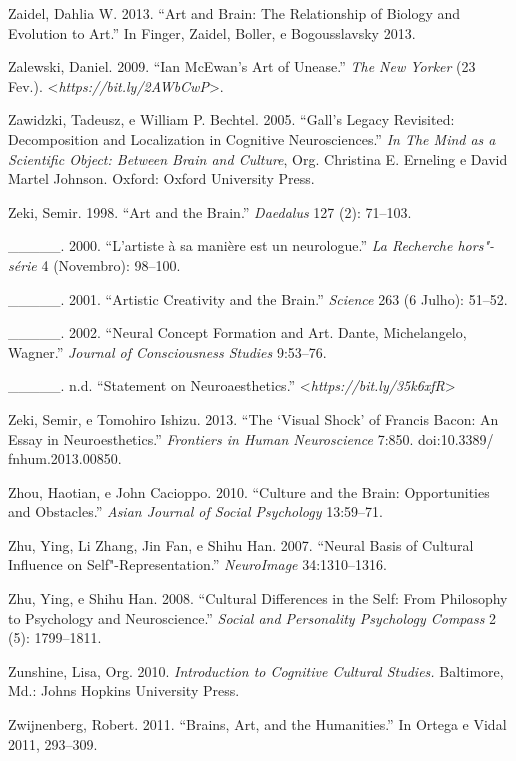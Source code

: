 {\begin{Parskip}
Zaidel, Dahlia W. 2013. ``Art and Brain: The Relationship of Biology and
Evolution to Art.'' In Finger, Zaidel, Boller, e Bogousslavsky 2013.

Zalewski, Daniel. 2009. ``Ian McEwan's Art of Unease.'' \emph{The New
Yorker} (23 Fev.).
\textless{}\emph{https://bit.ly/2AWbCwP}\textgreater{}.

Zawidzki, Tadeusz, e William P. Bechtel. 2005. ``Gall's Legacy
Revisited: Decomposition and Localization in Cognitive Neurosciences.''
\emph{In The Mind as a Scientific Object: Between Brain and Culture},
Org. Christina E. Erneling e David Martel Johnson. Oxford: Oxford
University Press.

Zeki, Semir. 1998. ``Art and the Brain.'' \emph{Daedalus} 127 (2):
71--103.

\_\_\_\_\_. 2000. ``L'artiste à sa manière est un neurologue.'' \emph{La
Recherche hors"-série} 4 (Novembro): 98--100.

\_\_\_\_\_. 2001. ``Artistic Creativity and the Brain.'' \emph{Science}
263 (6 Julho): 51--52.

\_\_\_\_\_. 2002. ``Neural Concept Formation and Art. Dante,
Michelangelo, Wagner.'' \emph{Journal of Consciousness Studies}
9:53--76.

\_\_\_\_\_. n.d. ``Statement on Neuroaesthetics.''
\textless{}\emph{https://bit.ly/35k6xfR}\textgreater{}

Zeki, Semir, e Tomohiro Ishizu. 2013. ``The `Visual Shock' of Francis
Bacon: An Essay in Neuroesthetics.'' \emph{Frontiers in Human
Neuroscience} 7:850. doi:10.3389/ fnhum.2013.00850.

Zhou, Haotian, e John Cacioppo. 2010. ``Culture and the Brain:
Opportunities and Obstacles.'' \emph{Asian Journal of Social Psychology}
13:59--71.

Zhu, Ying, Li Zhang, Jin Fan, e Shihu Han. 2007. ``Neural Basis of
Cultural Influence on Self"-Representation.'' \emph{NeuroImage}
34:1310--1316.

Zhu, Ying, e Shihu Han. 2008. ``Cultural Differences in the Self: From
Philosophy to Psychology and Neuroscience.'' \emph{Social and
Personality Psychology Compass} 2 (5): 1799--1811.

Zunshine, Lisa, Org. 2010. \emph{Introduction to Cognitive Cultural
Studies.} Baltimore, Md.: Johns Hopkins University Press.

Zwijnenberg, Robert. 2011. ``Brains, Art, and the Humanities.'' In
Ortega e Vidal 2011, 293--309.
\end{Parskip}}
